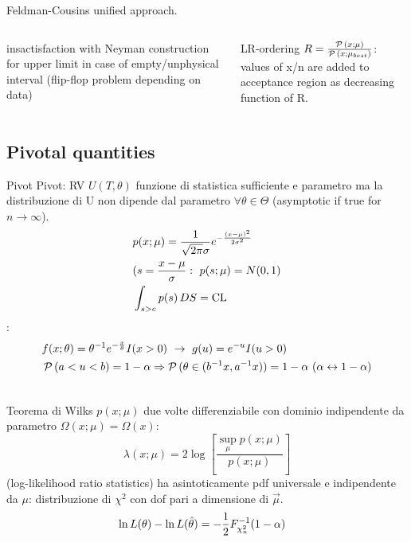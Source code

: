 \begin{frame}{Feldman-Cousins unified approach.}
\begin{columns}[T]
\begin{column}{0.5\textwidth}
insactisfaction with Neyman construction for upper limit in case of empty/unphysical interval (flip-flop problem depending on data)
\end{column}
\begin{column}{0.5\textwidth}
LR-ordering $R=\frac{\operatorname{\mathcal{P}}{(x;\mu)}}{\operatorname{\mathcal{P}}{(x;\mu_{best})}}$: values of x/n are added to acceptance region as decreasing function of R.
\end{column}
\end{columns}
\end{frame}

\subsection{Pivotal quantities}

\begin{frame}{Pivot}
Pivot: RV $U(T,\theta)$ funzione di statistica sufficiente e parametro ma la distribuzione di U non dipende dal parametro $\forall \theta\in\Theta$ (asymptotic if true for $n\to\infty$).
\begin{align*}
&p(x;\mu)=\frac{1}{\sqrt{2\pi}\sigma}e^{-\frac{(x-\mu)^2}{2\sigma^2}}\\
&(s=\frac{x-\mu}{\sigma}:\ p(s;\mu)=N(0,1)\\
&\int_{s>c}p(s)\,DS=\operatorname{CL}{}
\end{align*}
:
\begin{align*}
&f(x;\theta)=\invers{\theta}\exp{-\frac{x}{\theta}}I(x>0)\ \to\ g(u)=\exp{-u}I(u>0)\\
&\prob{(a<u<b)}=1-\alpha\Rightarrow\prob{(\theta\in(\invers{b}x,\invers{a}x))}=1-\alpha\ (\alpha\leftrightarrow1-\alpha)\\
&
\end{align*}
\end{frame}

\begin{frame}{Teorema di Wilks}
$p(x;\mu)$ due volte differenziabile con dominio indipendente da parametro $\Omega(x;\mu)=\Omega(x)$: \[\lambda(x;\mu)=2\log{[\frac{\sup_{\mu}{p(x;\mu)}}{p(x;\mu)}]}\] (log-likelihood ratio statistics) ha asintoticamente pdf universale e indipendente da $\mu$: distribuzione di $\chi^2$ con dof pari a dimensione di $\vec{\mu}$.
\begin{align*}
&\ln{L(\theta)}-\ln{L(\hat{\theta})}=-\frac{1}{2}{F}^{-1}_{\chi_n^2}(1-\alpha)
\end{align*}
\end{frame}

